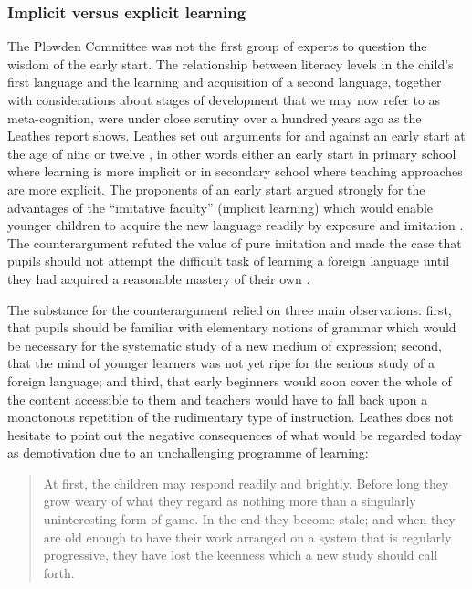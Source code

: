 \documentclass[output=paper]{langscibook}
\begin{document}
\subsubsection{Implicit versus explicit learning}

The Plowden Committee was not the first group of experts to question the wisdom of the early start. The relationship between literacy levels in the child’s first language and the learning and acquisition of a second language, together with considerations about stages of development that we may now refer to as meta-cognition, were under close scrutiny over a hundred years ago as the Leathes report shows. Leathes set out arguments for and against an early start at the age of nine or twelve \citep[114--120]{Leathes1918}, in other words either an early start in primary school where learning is more implicit or in secondary school where teaching approaches are more explicit. The proponents of an early start argued strongly for the advantages of the ``imitative faculty'' (implicit learning) which would enable younger children to acquire the new language readily by exposure and imitation \citep[115]{Leathes1918}. The counterargument refuted the value of pure imitation and made the case that pupils should not attempt the difficult task of learning a foreign language until they had acquired a reasonable mastery of their own \citep[117]{Leathes1918}. 

The substance for the counterargument relied on three main observations: first, that pupils should be familiar with elementary notions of grammar which would be necessary for the systematic study of a new medium of expression; second, that the mind of younger learners was not yet ripe for the serious study of a foreign language; and third, that early beginners would soon cover the whole of the content accessible to them and teachers would have to fall back upon a monotonous repetition of the rudimentary type of instruction. Leathes does not hesitate to point out the negative consequences of what would be regarded today as demotivation due to an unchallenging programme of learning: 

\begin{quote}
At first, the children may respond readily and brightly. Before long they grow weary of what they regard as nothing more than a singularly uninteresting form of game. In the end they become stale; and when they are old enough to have their work arranged on a system that is regularly progressive, they have lost the keenness which a new study should call forth. \citep[117]{Leathes1918} 
\end{quote}
\end{document}
